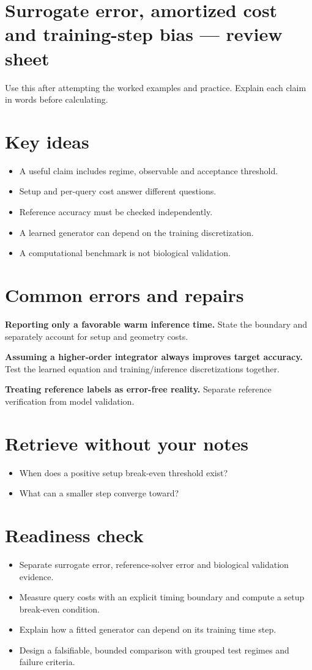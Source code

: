 \documentclass[11pt,letterpaper]{article}
\theoremstyle{definition}\newtheorem{definition}{Definition}\newtheorem{example}{Example}
\numberwithin{equation}{section}
\begin{document}
\section*{Surrogate error, amortized cost and training-step bias --- review sheet}
Use this after attempting the worked examples and practice. Explain each claim in words before calculating.

\section*{Key ideas}
\begin{itemize}
\item A useful claim includes regime, observable and acceptance threshold.
\item Setup and per-query cost answer different questions.
\item Reference accuracy must be checked independently.
\item A learned generator can depend on the training discretization.
\item A computational benchmark is not biological validation.
\end{itemize}
\section*{Common errors and repairs}
\textbf{Reporting only a favorable warm inference time.} State the boundary and separately account for setup and geometry costs.

\textbf{Assuming a higher-order integrator always improves target accuracy.} Test the learned equation and training/inference discretizations together.

\textbf{Treating reference labels as error-free reality.} Separate reference verification from model validation.

\section*{Retrieve without your notes}
\begin{itemize}
\item When does a positive setup break-even threshold exist?
\item What can a smaller step converge toward?
\end{itemize}
\section*{Readiness check}
\begin{itemize}
\item Separate surrogate error, reference-solver error and biological validation evidence.
\item Measure query costs with an explicit timing boundary and compute a setup break-even condition.
\item Explain how a fitted generator can depend on its training time step.
\item Design a falsifiable, bounded comparison with grouped test regimes and failure criteria.
\end{itemize}
\end{document}
